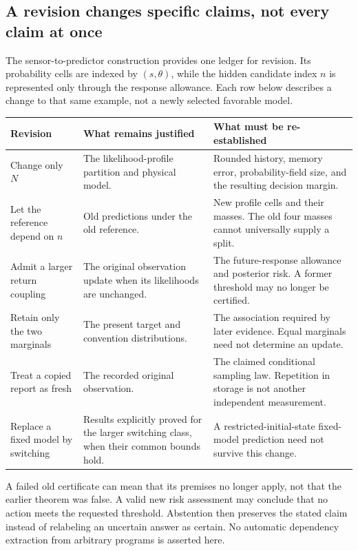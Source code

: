 \subsection{A revision changes specific claims, not every claim at once}
The sensor-to-predictor construction provides one ledger for revision. Its probability cells are indexed by $(s,\theta)$, while the hidden candidate index $n$ is represented only through the response allowance. Each row below describes a change to that same example, not a newly selected favorable model.

\begin{center}\small
\begin{tabularx}{\textwidth}{@{}P{.25\textwidth}YY@{}}\toprule
Revision & What remains justified & What must be re-established\\\midrule
Change only $N$ & The likelihood-profile partition and physical model. & Rounded history, memory error, probability-field size, and the resulting decision margin.\\
Let the reference depend on $n$ & Old predictions under the old reference. & New profile cells and their masses. The old four masses cannot universally supply a split.\\
Admit a larger return coupling & The original observation update when its likelihoods are unchanged. & The future-response allowance and posterior risk. A former threshold may no longer be certified.\\
Retain only the two marginals & The present target and convention distributions. & The association required by later evidence. Equal marginals need not determine an update.\\
Treat a copied report as fresh & The recorded original observation. & The claimed conditional sampling law. Repetition in storage is not another independent measurement.\\
Replace a fixed model by switching & Results explicitly proved for the larger switching class, when their common bounds hold. & A restricted-initial-state fixed-model prediction need not survive this change.\\\bottomrule
\end{tabularx}
\end{center}

A failed old certificate can mean that its premises no longer apply, not that the earlier theorem was false. A valid new risk assessment may conclude that no action meets the requested threshold. Abstention then preserves the stated claim instead of relabeling an uncertain answer as certain. No automatic dependency extraction from arbitrary programs is asserted here.

